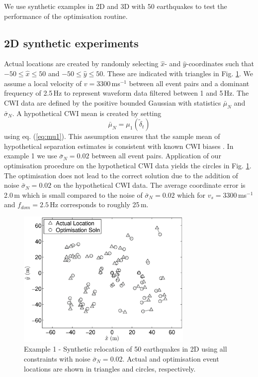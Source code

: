 \documentclass[extra]{gji}
\begin{document}
We use synthetic examples in 2D and 3D with 50 earthquakes to test
the performance of the optimisation routine.

\subsection{2D synthetic experiments}

Actual locations are created by
randomly selecting $\hat{x}$- and $\hat{y}$-coordinates such that $-50 \leq \hat{x} \leq 50$ and $-50 \leq \hat{y} \leq 50$.
These are indicated with triangles in Fig. \ref{fig-2D50eq-relocation_eg1}.
 We assume a local velocity of $v=3300\,$ms$^{-1}$ between all
event pairs and a dominant frequency of 2.5$\,$Hz to represent waveform data filtered between 1 and 5$\,$Hz.
The CWI data are defined by the positive bounded Gaussian with statistics
$\bar{\mu}_N$ and $\bar{\sigma}_N$. A hypothetical CWI mean is created by setting
\begin{equation}
\label{eq:hypothetical-CWI-mean-optichapt}
\bar{\mu}_N = \mu_1 \left( \widetilde{\delta}_t \right)
\end{equation}
using eq. (\ref{eq:mu1}). This assumption ensures that the sample
mean of hypothetical separation estimates is consistent with known
CWI biases \citep{dr_Robinson11a}. In example 1 we use
$\bar{\sigma}_N=0.02$ between all event pairs. Application of our
optimisation procedure on the hypothetical CWI data yields the
circles in Fig. \ref{fig-2D50eq-relocation_eg1}. The optimisation
does not lead to the correct solution due to the addition of noise
$\bar{\sigma}_N=0.02$ on the hypothetical CWI data. The average
coordinate error is 2.0\,m which is small compared to the noise of
$\bar{\sigma}_N=0.02$ which for $v_s=3300$\,ms$^{-1}$ and
$f_{dom}=2.5$\,Hz corresponds to roughly 25\,m.
\begin{figure}
\includegraphics[width = 20pc]{diags/locs_2D_50eq_1.eps}
\caption{Example 1 - Synthetic relocation of 50 earthquakes in 2D
using all constraints with noise $\bar{\sigma}_N=0.02$. Actual and
optimisation event locations are shown in triangles and circles,
respectively.} \label{fig-2D50eq-relocation_eg1}
\end{figure}
\end{document}
